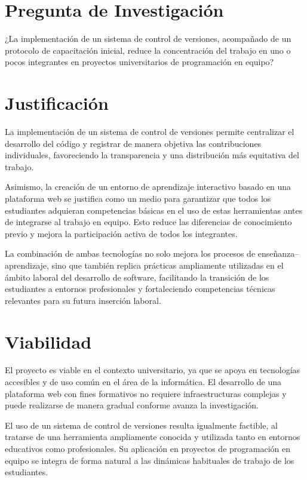 \documentclass[12pt,a4paper]{article}
\begin{document}
\section{Pregunta de Investigación}
¿La implementación de un sistema de control de versiones, acompañado de un protocolo de capacitación inicial, reduce la concentración del trabajo en uno o pocos integrantes en proyectos universitarios de programación en equipo?

\section{Justificación}
La implementación de un sistema de control de versiones permite centralizar el desarrollo del código y registrar de manera objetiva las contribuciones individuales, favoreciendo la transparencia y una distribución más equitativa del trabajo.

Asimismo, la creación de un entorno de aprendizaje interactivo basado en una plataforma web se justifica como un medio para garantizar que todos los estudiantes adquieran competencias básicas en el uso de estas herramientas antes de integrarse al trabajo en equipo. Esto reduce las diferencias de conocimiento previo y mejora la participación activa de todos los integrantes.

La combinación de ambas tecnologías no solo mejora los procesos de enseñanza–aprendizaje, sino que también replica prácticas ampliamente utilizadas en el ámbito laboral del desarrollo de software, facilitando la transición de los estudiantes a entornos profesionales y fortaleciendo competencias técnicas relevantes para su futura inserción laboral.

\section{Viabilidad}
El proyecto es viable en el contexto universitario, ya que se apoya en tecnologías accesibles y de uso común en el área de la informática. El desarrollo de una plataforma web con fines formativos no requiere infraestructuras complejas y puede realizarse de manera gradual conforme avanza la investigación.

El uso de un sistema de control de versiones resulta igualmente factible, al tratarse de una herramienta ampliamente conocida y utilizada tanto en entornos educativos como profesionales. Su aplicación en proyectos de programación en equipo se integra de forma natural a las dinámicas habituales de trabajo de los estudiantes.
\end{document}
